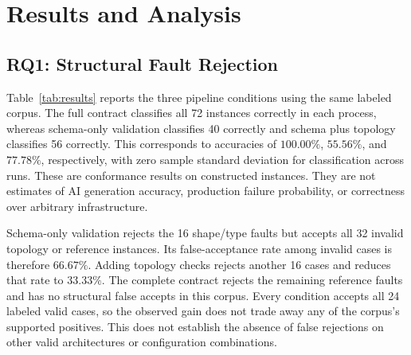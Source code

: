 \section{Results and Analysis}
\subsection{RQ1: Structural Fault Rejection}
Table~\ref{tab:results} reports the three pipeline conditions using the same labeled corpus. The full contract classifies all 72 instances correctly in each process, whereas schema-only validation classifies 40 correctly and schema plus topology classifies 56 correctly. This corresponds to accuracies of $100.00\%$, $55.56\%$, and $77.78\%$, respectively, with zero sample standard deviation for classification across runs. These are conformance results on constructed instances. They are not estimates of AI generation accuracy, production failure probability, or correctness over arbitrary infrastructure.
\begin{table}[t]
\caption{Three-process results. Values with uncertainty show mean $\pm$ sample SD; timing includes cloning. Bold denotes the highest structural accuracy on this corpus.}
\label{tab:results}
\centering\footnotesize

\end{table}
Schema-only validation rejects the 16 shape/type faults but accepts all 32 invalid topology or reference instances. Its false-acceptance rate among invalid cases is therefore $66.67\%$. Adding topology checks rejects another 16 cases and reduces that rate to $33.33\%$. The complete contract rejects the remaining reference faults and has no structural false accepts in this corpus. Every condition accepts all 24 labeled valid cases, so the observed gain does not trade away any of the corpus's supported positives. This does not establish the absence of false rejections on other valid architectures or configuration combinations.

